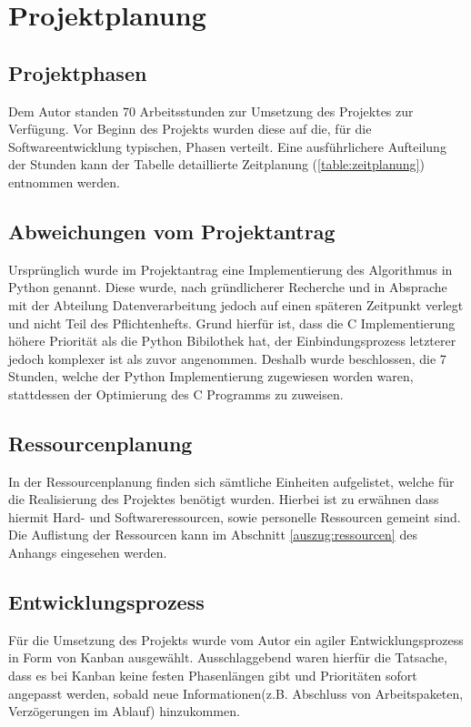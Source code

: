 \section{Projektplanung}
\label{section:projektplanung}
\subsection{Projektphasen}
Dem Autor standen 70 Arbeitsstunden zur Umsetzung des Projektes zur Verfügung.
Vor Beginn des Projekts wurden diese auf die, für die Softwareentwicklung
typischen, Phasen verteilt. Eine ausführlichere Aufteilung der Stunden kann der Tabelle
detaillierte Zeitplanung (\ref{table:zeitplanung}) entnommen werden.



\subsection{Abweichungen vom Projektantrag}
Ursprünglich wurde im Projektantrag eine Implementierung des Algorithmus in
Python genannt. Diese wurde, nach gründlicherer Recherche und in Absprache mit der
Abteilung Datenverarbeitung jedoch auf einen späteren Zeitpunkt verlegt und nicht
Teil des Pflichtenhefts. Grund hierfür ist, dass die C Implementierung höhere
Priorität als die Python Bibilothek hat, der Einbindungsprozess letzterer jedoch komplexer
ist als zuvor angenommen.
Deshalb wurde beschlossen, die 7 Stunden, welche der Python Implementierung
zugewiesen worden waren, stattdessen der Optimierung des C Programms zu zuweisen.

\subsection{Ressourcenplanung}
In der Ressourcenplanung finden sich sämtliche Einheiten aufgelistet, welche für
 die Realisierung des Projektes benötigt wurden. Hierbei ist zu erwähnen dass
 hiermit Hard- und Softwareressourcen, sowie personelle Ressourcen gemeint sind.
 Die Auflistung der Ressourcen kann im Abschnitt \ref{auszug:ressourcen} des Anhangs eingesehen werden.

\subsection{Entwicklungsprozess}
Für die Umsetzung des Projekts wurde vom Autor ein agiler Entwicklungsprozess in
Form von Kanban ausgewählt. Ausschlaggebend waren hierfür die Tatsache, dass es bei Kanban
keine festen Phasenlängen gibt und Prioritäten sofort angepasst werden, sobald
neue Informationen(z.B. Abschluss von Arbeitspaketen, Verzögerungen im Ablauf) hinzukommen.\par

